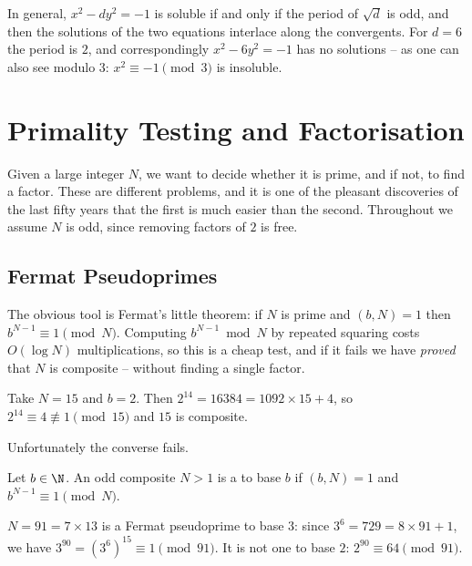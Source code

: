 \begin{remark}
	In general, $x^2 - dy^2 = -1$ is soluble if and only if the period of $\sqrt d$ is odd, and then the solutions of the two equations interlace along the convergents. For $d = 6$ the period is $2$, and correspondingly $x^2 - 6y^2 = -1$ has no solutions -- as one can also see modulo $3$: $x^2 \equiv -1 \pmod 3$ is insoluble.
\end{remark}

\section{Primality Testing and Factorisation}

Given a large integer $N$, we want to decide whether it is prime, and if not, to find a factor. These are different problems, and it is one of the pleasant discoveries of the last fifty years that the first is much easier than the second. Throughout we assume $N$ is odd, since removing factors of $2$ is free.

\subsection{Fermat Pseudoprimes}

The obvious tool is Fermat's little theorem: if $N$ is prime and $(b, N) = 1$ then $b^{N-1} \equiv 1 \pmod N$. Computing $b^{N-1} \bmod N$ by repeated squaring costs $O(\log N)$ multiplications, so this is a cheap test, and if it fails we have \emph{proved} that $N$ is composite -- without finding a single factor.

\begin{example}
	Take $N = 15$ and $b = 2$. Then $2^{14} = 16384 = 1092\times 15 + 4$, so $2^{14} \equiv 4 \not\equiv 1 \pmod{15}$ and $15$ is composite.
\end{example}

Unfortunately the converse fails.

\begin{definition}
	Let $b \in \N$. An odd composite $N > 1$ is a  to base $b$ if $(b, N) = 1$ and $b^{N-1}\equiv 1 \pmod N$.
\end{definition}

\begin{example}
	$N = 91 = 7\times13$ is a Fermat pseudoprime to base $3$: since $3^6 = 729 = 8\times91 + 1$, we have $3^{90} = (3^6)^{15} \equiv 1 \pmod{91}$. It is not one to base $2$: $2^{90} \equiv 64 \pmod{91}$.
\end{example}


